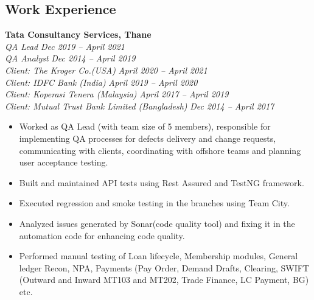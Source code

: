 \documentclass[margin,line]{resume}
\begin{document}
\begin{resume}
    \section{\mysidestyle Work Experience}
    \textbf{Tata Consultancy Services, Thane}\\
           \textsl{QA Lead} \hfill \textsl{Dec 2019 -- April 2021}\vspace{0mm}\\
           \textsl{QA Analyst} \hfill \textsl{Dec 2014 -- April 2019} \vspace{0mm}\\
           \textsl{Client: The Kroger Co.(USA)} \hfill \textsl{April 2020 -- April 2021} \vspace{0mm}\\
           \textsl{Client: IDFC Bank (India)} \hfill \textsl{April 2019 -- April 2020} \vspace{0mm}\\
           \textsl{Client: Koperasi Tenera (Malaysia)} \hfill \textsl{April 2017 -- April 2019} \vspace{0mm}\\
           \textsl{Client: Mutual Trust Bank Limited (Bangladesh)} \hfill \textsl{Dec 2014 -- April 2017} \vspace{0mm}\\
    \begin{itemize}
            \item Worked as QA Lead (with team size of 5 members), responsible for implementing QA processes for defects delivery  and change requests, communicating with clients, coordinating with offshore teams and planning user acceptance testing.
            \item Built and maintained API tests using Rest Assured and TestNG framework.
            \item Executed regression and smoke testing in the branches
using Team City.
            \item Analyzed issues generated by Sonar(code quality tool) and fixing it in the automation code for enhancing code quality.
            \item Performed manual testing of Loan lifecycle, Membership modules, General ledger Recon, NPA, Payments (Pay Order, Demand Drafts, Clearing, SWIFT (Outward and Inward MT103 and MT202, Trade Finance, LC Payment, BG) etc.
       \end{itemize}
\vspace{3mm}

\end{resume}
\end{document}
